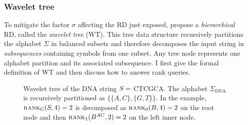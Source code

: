 
\subsubsection{Wavelet tree}

To mitigate the factor $\sigma$ affecting the RD just exposed, \citeauthor{Grossi2003} propose a \emph{hierarchical} RD, called the \emph{wavelet tree} (WT).
This tree data structure recursively partitions the alphabet $\Sigma$ in balanced subsets and therefore decomposes the input string in \emph{subsequences} containing symbols from one subset.
Any tree node represents one alphabet partition and its associated subsequence.
I first give the formal definition of WT and then discuss how to answer rank queries.


\begin{figure}[b]
\begin{center}
\caption[Example of wavelet tree]{Wavelet tree of the DNA string $S=$ {\ttfamily CTCGCA}. The alphabet $\Sigma_{\text{DNA}}$ is recursively partitioned as $\{ \{A,C\}, \{G,T\} \}$. In the example, $\textsc{rank}_{\text{C}}(S,4)=2$ is decomposed as $\textsc{rank}_0(B,4) = 2$ on the root node and then $\textsc{rank}_1(B^{AC}, 2) = 2$ on the left inner node.}
\label{fig:wt_dna}
\ttfamily

\end{center}
\end{figure}

